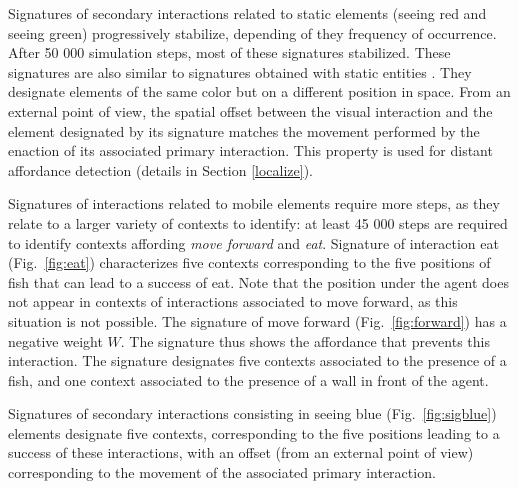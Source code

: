 \documentclass[conference]{IEEEtran}
\makeatletter
\let\cite\relax
\DeclareRobustCommand{\cite}{%
	\let\new@cite@pre\@gobble
	\@ifnextchar[\new@cite{\@citex[]}}
\def\new@cite[#1]{\@ifnextchar[{\new@citea{#1}}{\@citex[#1]}}
\def\new@citea#1{\def\new@cite@pre{#1}\@citex}
\makeatother
\begin{document}

Signatures of secondary interactions related to static elements (seeing red and seeing green) progressively stabilize, depending of they frequency of occurrence. After 50 000 simulation steps, most of these signatures stabilized. These signatures are also similar to signatures obtained with static entities \cite{gay:space}\cite{gay:dynamic}. They designate elements of the same color but on a different position in space. From an external point of view, the spatial offset between the visual interaction and the element designated by its signature matches the movement performed by the enaction of its associated primary interaction. This property is used for distant affordance detection \cite{gay:space} (details in Section \ref{localize}).


Signatures of interactions related to mobile elements require more steps, as they relate to a larger variety of contexts to identify: at least 45 000 steps are required to identify contexts affording \textit{move forward} and \textit{eat}. Signature of interaction eat (Fig.~\ref{fig:eat}) characterizes five contexts corresponding to the five positions of fish that can lead to a success of eat. Note that the position under the agent does not appear in contexts of interactions associated to move forward, as this situation is not possible. The signature of move forward (Fig.~\ref{fig:forward}) has a negative weight $W$. The signature thus shows the affordance that prevents this interaction. The signature designates five contexts associated to the presence of a fish, and one context associated to the presence of a wall in front of the agent.

Signatures of secondary interactions consisting in seeing blue (Fig.~\ref{fig:sigblue}) elements designate five contexts, corresponding to the five positions leading to a success of these interactions, with an offset (from an external point of view) corresponding to the movement of the associated primary interaction.
\end{document}
